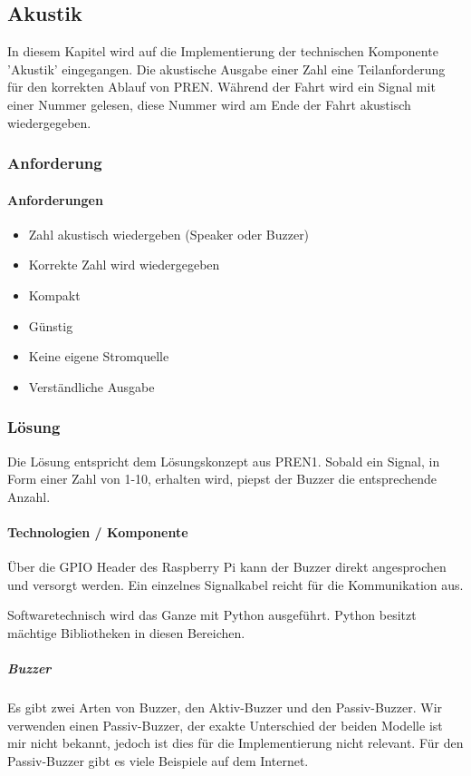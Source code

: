 \documentclass[../../main.tex]{subfiles}
\begin{document}
\subsection{Akustik}
In diesem Kapitel wird auf die Implementierung der technischen Komponente 'Akustik' eingegangen. Die akustische Ausgabe einer Zahl eine Teilanforderung für den korrekten Ablauf von PREN. Während der Fahrt wird ein Signal mit einer Nummer gelesen, diese Nummer wird am Ende der Fahrt akustisch wiedergegeben.

\subsubsection{Anforderung}

\paragraph{Anforderungen}
\begin{itemize}
    \item Zahl akustisch wiedergeben (Speaker oder Buzzer)
    \item Korrekte Zahl wird wiedergegeben
    \item Kompakt
    \item Günstig
    \item Keine eigene Stromquelle
    \item Verständliche Ausgabe
\end{itemize}

\subsubsection{Lösung}
Die Lösung entspricht dem Lösungskonzept aus PREN1. Sobald ein Signal, in Form einer Zahl von 1-10, erhalten wird, piepst der Buzzer die entsprechende Anzahl.

\paragraph{Technologien / Komponente}
Über die GPIO Header des Raspberry Pi kann der Buzzer direkt angesprochen und versorgt werden. Ein einzelnes Signalkabel reicht für die Kommunikation aus.

Softwaretechnisch wird das Ganze mit Python ausgeführt. Python besitzt mächtige Bibliotheken in diesen Bereichen.

\subparagraph{Buzzer}
Es gibt zwei Arten von Buzzer, den Aktiv-Buzzer und den Passiv-Buzzer. Wir verwenden einen Passiv-Buzzer, der exakte Unterschied der beiden Modelle ist mir nicht bekannt, jedoch ist dies für die Implementierung nicht relevant. Für den Passiv-Buzzer gibt es viele Beispiele auf dem Internet.
\end{document}
